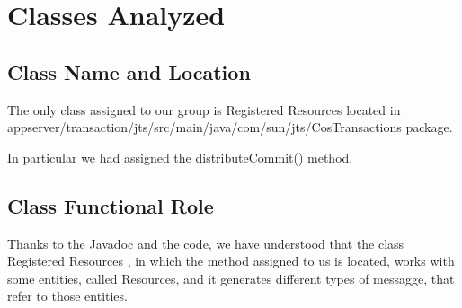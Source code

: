 \section{Classes Analyzed}
\subsection{Class Name and Location}
	The only class assigned to our group is \ttfamily Registered Resources \normalfont located in \ttfamily appserver/transaction/jts/src/main/java/com/sun/jts/CosTransactions \normalfont package.
	
	In particular we had assigned the \ttfamily distributeCommit() \normalfont method.
	
\subsection{Class Functional Role}
	Thanks to the Javadoc and the code, we have understood that the class \ttfamily Registered Resources \normalfont , in which the method assigned to us is located, works with some entities, called Resources, and it generates different types of messagge, that refer to those entities. 